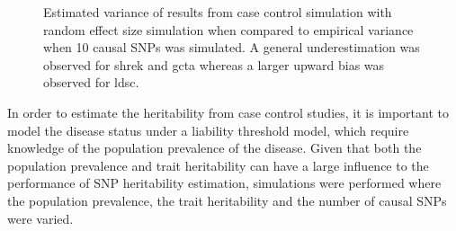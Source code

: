 \begin{figure}
{					
					\label{fig:ldscInCC10RandVarCom}
				}
				\caption[Estimation of Variance in Case Control Simulation (10 Causal)]
				{Estimated variance of results from case control simulation with random effect size simulation when compared to empirical variance when 10 causal \glspl{SNP} was simulated.
					A general underestimation was observed for \gls{shrek} and \gls{gcta} whereas a larger upward bias was observed for \gls{ldsc}.} 
				\label{fig:CC10RandVarCom}
			\end{figure}
			
		In order to estimate the heritability from case control studies, it is important to model the disease status under a liability threshold model, which require knowledge of the population prevalence of the disease.
		Given that both the population prevalence and trait heritability can have a large influence to the performance of \gls{SNP} heritability estimation, simulations were performed where the population prevalence, the trait heritability and the number of causal \glspl{SNP} were varied. 
		
